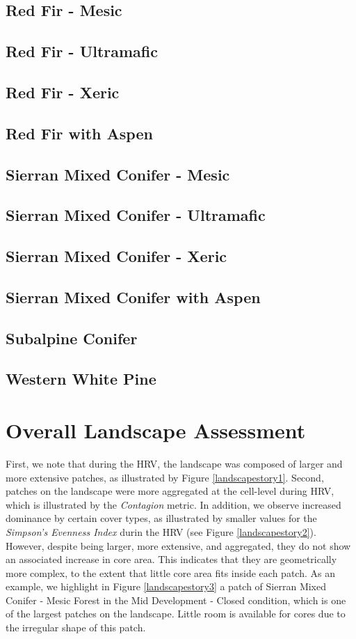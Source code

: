 \subsection{Red Fir - Mesic} 
\subsection{Red Fir - Ultramafic} 
\subsection{Red Fir - Xeric} 
\subsection{Red Fir with Aspen} 
\subsection{Sierran Mixed Conifer - Mesic} 
\subsection{Sierran Mixed Conifer - Ultramafic} 
\subsection{Sierran Mixed Conifer - Xeric} 
\subsection{Sierran Mixed Conifer with Aspen} 
\subsection{Subalpine Conifer} 
\subsection{Western White Pine} 



\section{Overall Landscape Assessment}

First, we note that during the HRV, the landscape was composed of larger and more extensive patches, as illustrated by Figure \ref{landscapestory1}. 
Second, patches on the landscape were more aggregated at the cell-level during HRV, which is illustrated by the \emph{Contagion} metric. In addition, we observe increased dominance by certain cover types, as illustrated by smaller values for the \emph{Simpson's Evenness Index} durin the HRV (see Figure \ref{landscapestory2}). However, despite being larger, more extensive, and aggregated, they do not show an associated increase in core area. This indicates that they are geometrically more complex, to the extent that little core area fits inside each patch. As an example, we highlight in Figure \ref{landscapestory3} a patch of Sierran Mixed Conifer - Mesic Forest in the Mid Development - Closed condition, which is one of the largest patches on the landscape. Little room is available for cores due to the irregular shape of this patch.
